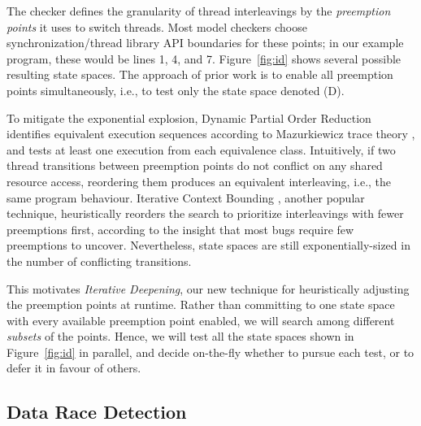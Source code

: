 The checker defines the granularity of thread interleavings by the {\em preemption points} it uses to switch threads.
Most model checkers \cite{chess,dbug-ssv} choose synchronization/thread library API boundaries for these points;
in our example program, these would be lines 1, 4, and 7.
Figure~\ref{fig:id} shows several possible resulting state spaces.
The approach of prior work is to enable all preemption points simultaneously, i.e., to test only the state space denoted (D).

To mitigate the exponential explosion,
Dynamic Partial Order Reduction \cite{dpor} identifies equivalent execution sequences according to Mazurkiewicz trace theory \cite{mazurkiewicz},
and tests at least one execution from each equivalence class.
Intuitively, if two thread transitions between preemption points do not conflict on any shared resource access, reordering them produces an equivalent interleaving, i.e., the same program behaviour.
Iterative Context Bounding \cite{chess-icb}, another popular technique, heuristically reorders the search to prioritize interleavings with fewer preemptions first, according to the insight that most bugs require few preemptions to uncover.
Nevertheless, state spaces are still exponentially-sized in the number of conflicting transitions.

This motivates {\em Iterative Deepening}, our new technique for heuristically adjusting the preemption points at runtime.
Rather than committing to one state space with every available preemption point enabled,
we will search among different {\em subsets} of the points.
Hence, we will test all the state spaces shown in Figure~\ref{fig:id} in parallel,
and decide on-the-fly whether to pursue each test, or to defer it in favour of others.

\subsection{Data Race Detection}
\label{sec:overview-dr}

